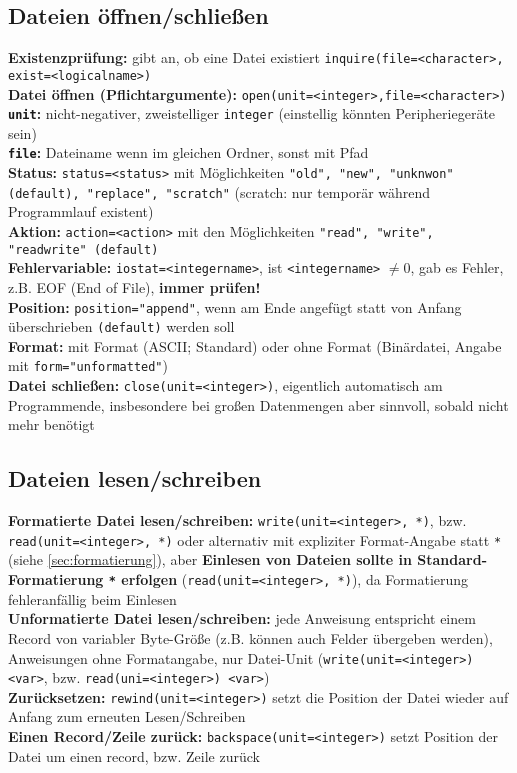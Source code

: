\documentclass[a4paper, twocolumn]{scrarticle}
\begin{document}
\subsection{Dateien öffnen/schließen}\label{sec:dateien-oeffnen}
\textbf{Existenzprüfung:} gibt an, ob eine Datei existiert \lstinline|inquire(file=<character>, exist=<logicalname>)| \\
\textbf{Datei öffnen (Pflichtargumente):} \lstinline|open(unit=<integer>,file=<character>)|\\
\textbf{\lstinline|unit|:} nicht-negativer, zweistelliger \lstinline|integer| (einstellig könnten Peripheriegeräte sein)\\
\textbf{\lstinline|file|:} Dateiname wenn im gleichen Ordner, sonst mit Pfad\\
\textbf{Status:} \lstinline|status=<status>| mit Möglichkeiten \lstinline|"old", "new", "unknwon" (default), "replace", "scratch"| (scratch: nur temporär während Programmlauf existent)\\
\textbf{Aktion:} \lstinline|action=<action>| mit den Möglichkeiten \lstinline|"read", "write", "readwrite" (default)|\\
\textbf{Fehlervariable:} \lstinline|iostat=<integername>|, ist \lstinline|<integername>| $\neq 0$, gab es Fehler, z.B. EOF (End of File), \textbf{immer prüfen!}\\
\textbf{Position:} \lstinline|position="append"|, wenn am Ende angefügt statt von Anfang überschrieben \lstinline|(default)| werden soll\\
\textbf{Format:} mit Format (ASCII; Standard) oder ohne Format (Binärdatei, Angabe mit \lstinline|form="unformatted"|)\\
\textbf{Datei schließen:} \lstinline|close(unit=<integer>)|, eigentlich automatisch am Programmende, insbesondere bei großen Datenmengen aber sinnvoll, sobald nicht mehr benötigt

\subsection{Dateien lesen/schreiben}
\textbf{Formatierte Datei lesen/schreiben:} \lstinline|write(unit=<integer>, *)|, bzw. \lstinline|read(unit=<integer>, *)| oder alternativ mit expliziter Format-Angabe statt \lstinline|*| (siehe \cref{sec:formatierung}), aber
\textbf{Einlesen von Dateien sollte in Standard-Formatierung \lstinline|*| erfolgen} (\lstinline|read(unit=<integer>, *)|), da Formatierung fehleranfällig beim Einlesen\\
\textbf{Unformatierte Datei lesen/schreiben:} jede Anweisung entspricht einem Record von variabler Byte-Größe (z.B. können auch Felder übergeben werden), Anweisungen ohne Formatangabe, nur Datei-Unit (\lstinline|write(unit=<integer>) <var>|, bzw. \lstinline|read(uni=<integer>) <var>|)\\
\textbf{Zurücksetzen:} \lstinline|rewind(unit=<integer>)| setzt die Position der Datei wieder auf Anfang zum erneuten Lesen/Schreiben\\
\textbf{Einen Record/Zeile zurück:} \lstinline|backspace(unit=<integer>)| setzt Position der Datei um einen record, bzw. Zeile zurück
\end{document}
